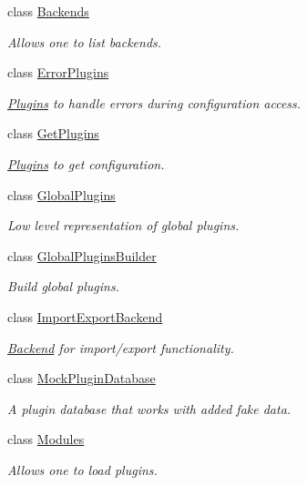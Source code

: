 \begin{DoxyCompactItemize}
class \hyperlink{classkdb_1_1tools_1_1Backends}{Backends}
\begin{DoxyCompactList}\small\item\em Allows one to list backends. \end{DoxyCompactList}\item 
class \hyperlink{classkdb_1_1tools_1_1ErrorPlugins}{Error\+Plugins}
\begin{DoxyCompactList}\small\item\em \hyperlink{classkdb_1_1tools_1_1Plugins}{Plugins} to handle errors during configuration access. \end{DoxyCompactList}\item 
class \hyperlink{classkdb_1_1tools_1_1GetPlugins}{Get\+Plugins}
\begin{DoxyCompactList}\small\item\em \hyperlink{classkdb_1_1tools_1_1Plugins}{Plugins} to get configuration. \end{DoxyCompactList}\item 
class \hyperlink{classkdb_1_1tools_1_1GlobalPlugins}{Global\+Plugins}
\begin{DoxyCompactList}\small\item\em Low level representation of global plugins. \end{DoxyCompactList}\item 
class \hyperlink{classkdb_1_1tools_1_1GlobalPluginsBuilder}{Global\+Plugins\+Builder}
\begin{DoxyCompactList}\small\item\em Build global plugins. \end{DoxyCompactList}\item 
class \hyperlink{classkdb_1_1tools_1_1ImportExportBackend}{Import\+Export\+Backend}
\begin{DoxyCompactList}\small\item\em \hyperlink{classkdb_1_1tools_1_1Backend}{Backend} for import/export functionality. \end{DoxyCompactList}\item 
class \hyperlink{classkdb_1_1tools_1_1MockPluginDatabase}{Mock\+Plugin\+Database}
\begin{DoxyCompactList}\small\item\em A plugin database that works with added fake data. \end{DoxyCompactList}\item 
class \hyperlink{classkdb_1_1tools_1_1Modules}{Modules}
\begin{DoxyCompactList}\small\item\em Allows one to load plugins. \end{DoxyCompactList}\item 

\end{DoxyCompactItemize}
